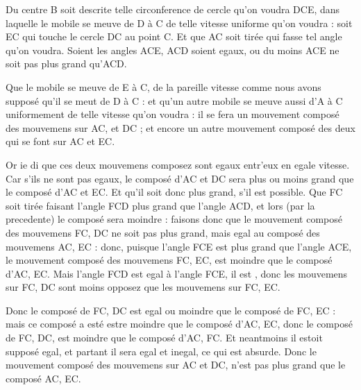 \documentclass[11pt,a4paper]{article}
\begin{document}
 Du centre B soit descrite telle circonference de cercle qu'on voudra DCE, dans laquelle le mobile se meuve de D à C de telle vitesse uniforme qu'on voudra : soit \struck{\ill{}}  \struck{\ill{}} EC qui touche le cercle DC au point C. Et que AC soit tirée qui fasse tel angle qu'on voudra. Soient les angles ACE, ACD soient egaux, ou du moins ACE ne soit pas plus grand qu'ACD.

Que le mobile \struck{\ill{}} se meuve de E à C, de la pareille vitesse \ill{} comme nous avons supposé qu'il se meut de D à C : et qu'un autre mobile se meuve aussi d'A à C uniformement \struck{\ill{}} de telle vitesse qu'on voudra : il se fera un mouvement composé des mouvemens sur AC, et DC ; et encore un autre mouvement composé des deux qui se font sur AC et EC.

Or ie di que ces deux mouvemens  composez sont egaux entr'eux en egale vitesse. Car s'ils ne sont pas egaux, le composé d'AC et DC sera plus ou moins grand que le composé d'AC et EC. Et qu'il soit donc plus grand,  s'il est possible. Que FC soit tirée faisant l'angle FCD plus grand que l'angle ACD, et lors (par la precedente) le composé sera moindre : faisons donc que le mouvement composé des mouvemens FC, DC ne soit pas plus grand, mais egal au composé des mouvemens AC, EC : donc, puisque l'angle FCE est plus grand que l'angle ACE, le mouvement composé des mouvemens FC, EC, est moindre que le composé d'AC, EC. Mais l'angle FCD est egal à l'angle FCE, \struck{\ill{}} \add{\ill{}} il est , donc les mouvemens sur FC, DC    sont  moins opposez que les mouvemens sur FC, EC.

Donc le composé de FC, DC est egal ou moindre que le composé de FC, EC : mais ce composé a esté  \struck{\ill{}} estre moindre que le composé d'AC, EC, donc le composé de FC, DC, est moindre que le composé d'AC, FC. Et neantmoins il estoit supposé egal, et partant il sera egal et inegal, ce qui est absurde. Donc le mouvement composé des mouvemens sur AC et DC, n'est pas plus grand que le composé  AC, EC.
\end{document}
